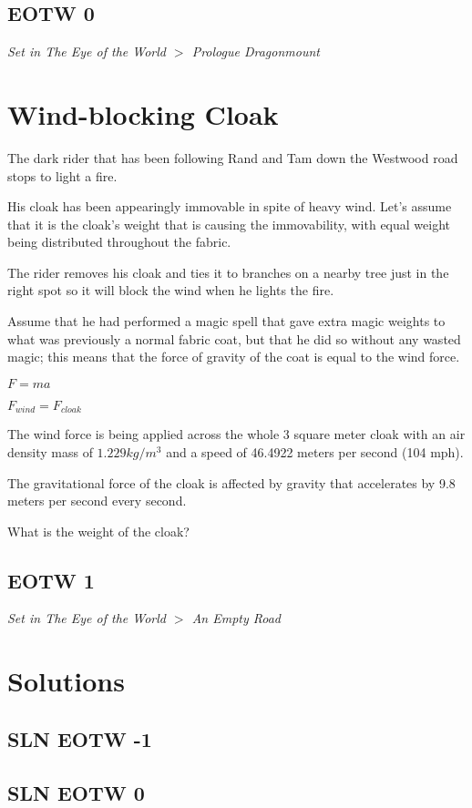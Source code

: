 \documentclass{article}
\begin{document}
\subsection*{EOTW 0}
\textit{ Set in The Eye of the World $>$ Prologue Dragonmount }  \pagebreak

\section*{Wind-blocking Cloak}

The dark rider that has been following Rand and Tam down the Westwood road
stops to light a fire.

His cloak has been appearingly immovable in spite of heavy wind. Let's assume
that it is the cloak's weight that is causing the immovability, with equal
weight being distributed throughout the fabric.

The rider removes his cloak and ties it to branches on a nearby tree
just in the right spot so it will block the wind when he lights the fire.

Assume that he had performed a magic spell that gave extra magic weights
to what was previously a normal fabric coat, but that he did so
without any wasted magic; this means that the force of gravity of the coat
is equal to the wind force.

$F = ma$

$F_{wind} = F_{cloak}$

The wind force is being applied across the whole 3 square meter cloak
with an air density mass of $1.229 kg / m^{3}$ and a speed
of 46.4922 meters per second (104 mph).

The gravitational force of the cloak is affected by
gravity that accelerates by 9.8 meters per second every second.

What is the weight of the cloak?

\subsection*{EOTW 1}
\textit{ Set in The Eye of the World $>$ An Empty Road }  \pagebreak

\section*{Solutions}

\subsection*{SLN EOTW -1}
 \pagebreak

\subsection*{SLN EOTW 0}
\end{document}
